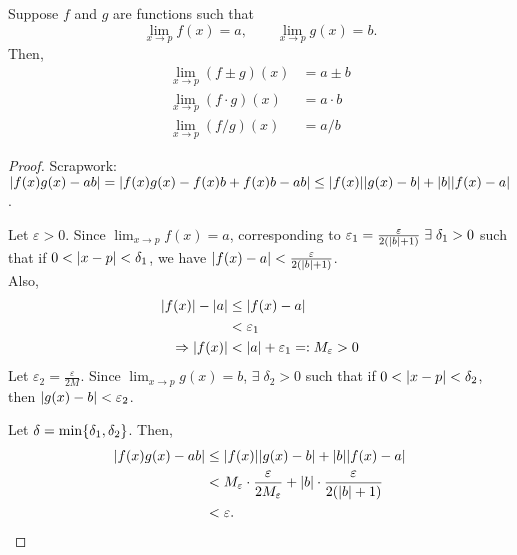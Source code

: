 \begin{thm} \label{thm:limit:laws}
    Suppose $f$ and $g$ are functions such that \[
        \lim_{x \to p} f(x) = a, \qquad \lim_{x \to p} g(x) = b.
    \] Then,
    \begin{align}
        \lim_{x \to p} (f \pm g)(x) &= a \pm b \\
        \lim_{x \to p} (f \cdot g)(x) &= a \cdot b \\
        \lim_{x \to p} (f/g)(x) &= a/b
    \end{align}
\end{thm}
\begin{proof}
    Scrapwork: $\abs{f(x) g(x) - ab} = \abs{f(x)g(x) - f(x) b + f(x) b - ab} \leq \abs{f(x)} \abs{g(x) - b} + \abs{b} \abs{f(x) - a}$.

    Let $\varepsilon > 0$. Since $\lim_{x \to p} f(x) = a$, corresponding to $\varepsilon_{1} = \frac{\varepsilon}{2(\abs{ b } + 1)} \;\exists\; \delta_{1} > 0 $ such that if $0 < \abs{ x - p } < \delta_{1}$, we have $\abs{ f(x) - a } < \frac{\varepsilon}{2(\abs{ b } + 1)}$. \\
    Also, \begin{align*}
        \abs{ f(x) } - \abs{ a} &\leq  \abs{ f(x) - a } \\
        &< \varepsilon_{1} \\
        \implies \abs{ f(x) } &< \abs{ a } + \varepsilon_{1} =: M_{\varepsilon} > 0
    \end{align*}
    Let $\varepsilon_{2} = \frac{\varepsilon}{2M}$. Since $\lim_{x \to p} g(x) = b$, $\exists\; \delta_{2} > 0$ such that if $0 < \abs{ x - p } < \delta_{2}$, then $\abs{ g(x) - b } < \varepsilon_{2}$.

    Let $\delta = \min\set{\delta_{1}, \delta_{2}}$. Then,
    \begin{align*}
        \abs{ f(x) g(x) - ab } &\leq \abs{ f(x) } \abs{ g(x) - b} + \abs{ b } \abs{ f(x) - a } \\
        &< M_{\varepsilon} \cdot \frac{\varepsilon}{2 M_{\varepsilon}} + \abs{ b } \cdot \frac{\varepsilon}{2(\abs{ b} + 1)} \\
        &< \varepsilon. \qedhere
    \end{align*}
\end{proof}
